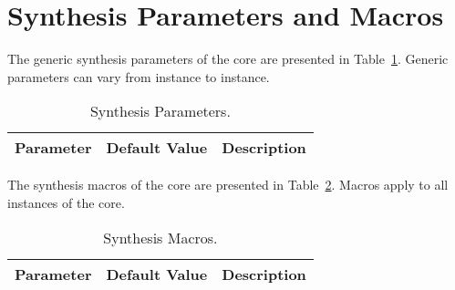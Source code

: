 \section{Synthesis Parameters and Macros}
\label{sec:sp}

The generic synthesis parameters of the core are presented in Table~\ref{tab:sp}. Generic parameters can vary from instance to instance.

\begin{table}[H]
  \centering
    \begin{tabularx}{\textwidth}{ | c | c | X | }
    \hline
    \rowcolor{iob-green}
    {\bf Parameter} & {\bf Default Value} & {\bf Description} \\\hline

    

    \end{tabularx}
  \caption{Synthesis Parameters.}
  \label{tab:sp}
\end{table}

The synthesis macros of the core are presented in Table~\ref{tab:sm}. Macros
apply to all instances of the core.

\begin{table}[H]
  \centering
    \begin{tabularx}{\textwidth}{ | c | c | X | }
    \hline
    \rowcolor{iob-green}
    {\bf Parameter} & {\bf Default Value} & {\bf Description} \\\hline

    

    \end{tabularx}
  \caption{Synthesis Macros.}
  \label{tab:sm}
\end{table}

